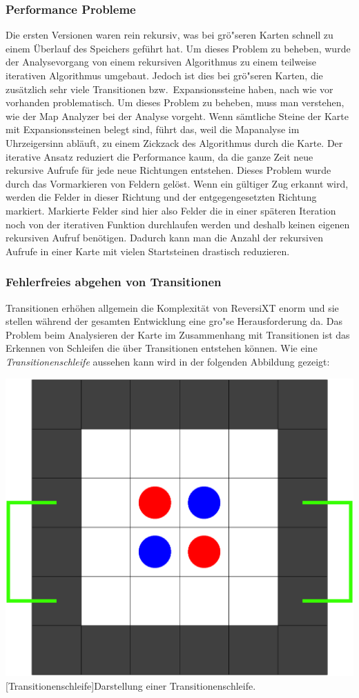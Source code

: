 \subsubsection{Performance Probleme}\label{subsubsec:performance-probleme}
Die ersten Versionen waren rein rekursiv, was bei gr\"o"seren Karten schnell zu einem \"Uberlauf des Speichers gef\"uhrt hat.
Um dieses Problem zu beheben, wurde der Analysevorgang von einem rekursiven Algorithmus zu einem teilweise iterativen Algorithmus umgebaut.
Jedoch ist dies bei gr\"o"seren Karten, die zus\"atzlich sehr viele Transitionen bzw.\ Expansionssteine haben, nach wie vor vorhanden problematisch.
Um dieses Problem zu beheben, muss man verstehen, wie der Map Analyzer bei der Analyse vorgeht.
Wenn s\"amtliche Steine der Karte mit Expansionssteinen belegt sind, f\"uhrt das, weil die Mapanalyse im Uhrzeigersinn abl\"auft, zu einem Zickzack des Algorithmus durch die Karte.
Der iterative Ansatz reduziert die Performance kaum, da die ganze Zeit neue rekursive Aufrufe f\"ur jede neue Richtungen entstehen.
Dieses Problem wurde durch das Vormarkieren von Feldern gel\"ost.
Wenn ein g\"ultiger Zug erkannt wird, werden die Felder in dieser Richtung und der entgegengesetzten Richtung markiert.
Markierte Felder sind hier also Felder die in einer sp\"ateren Iteration noch von der iterativen Funktion durchlaufen werden und deshalb keinen eigenen rekursiven Aufruf ben\"otigen.
Dadurch kann man die Anzahl der rekursiven Aufrufe in einer Karte mit vielen Startsteinen drastisch reduzieren.

\subsubsection{Fehlerfreies abgehen von Transitionen}\label{subsubsec:fehlerfreie-transitionen}
Transitionen erh\"ohen allgemein die Komplexit\"at von ReversiXT enorm und sie stellen w\"ahrend der gesamten Entwicklung eine gro"se Herausforderung da.
Das Problem beim Analysieren der Karte im Zusammenhang mit Transitionen ist das Erkennen von Schleifen die \"uber Transitionen entstehen k\"onnen.
Wie eine \textit{Transitionenschleife} aussehen kann wird in der folgenden Abbildung gezeigt:

\vspace{1em}
\begin{minipage}{\linewidth}
    \centering
    \includegraphics[width=0.3\linewidth]{pics/transition-loop}
    [Transitionenschleife]{Darstellung einer Transitionenschleife.}
    \label{fig:transition-loop}
\end{minipage}
\vspace{0.5em}

